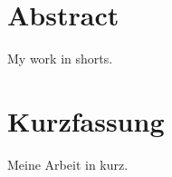 \thispagestyle{plain}

\section*{Abstract}
My work in shorts.

\section*{Kurzfassung}
\begin{german}
Meine Arbeit in kurz.
\end{german}
